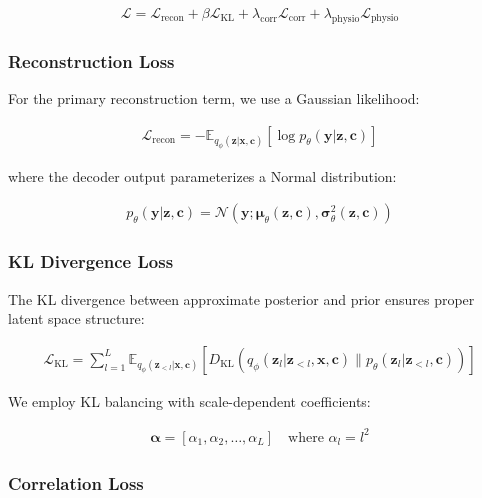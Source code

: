\documentclass[11pt]{article}
\begin{document}
\begin{align}
\mathcal{L} = \mathcal{L}_{\text{recon}} + \beta \mathcal{L}_{\text{KL}} + \lambda_{\text{corr}} \mathcal{L}_{\text{corr}} + \lambda_{\text{physio}} \mathcal{L}_{\text{physio}}
\end{align}

\subsubsection{Reconstruction Loss}

For the primary reconstruction term, we use a Gaussian likelihood:

\begin{align}
\mathcal{L}_{\text{recon}} = -\mathbb{E}_{q_\phi(\mathbf{z}|\mathbf{x},\mathbf{c})}[\log p_\theta(\mathbf{y}|\mathbf{z},\mathbf{c})]
\end{align}

where the decoder output parameterizes a Normal distribution:

\begin{align}
p_\theta(\mathbf{y}|\mathbf{z},\mathbf{c}) = \mathcal{N}(\mathbf{y}; \boldsymbol{\mu}_\theta(\mathbf{z},\mathbf{c}), \boldsymbol{\sigma}_\theta^2(\mathbf{z},\mathbf{c}))
\end{align}

\subsubsection{KL Divergence Loss}

The KL divergence between approximate posterior and prior ensures proper latent space structure:

\begin{align}
\mathcal{L}_{\text{KL}} = \sum_{l=1}^L \mathbb{E}_{q_\phi(\mathbf{z}_{<l}|\mathbf{x},\mathbf{c})}[D_{\text{KL}}(q_\phi(\mathbf{z}_l|\mathbf{z}_{<l},\mathbf{x},\mathbf{c}) \| p_\theta(\mathbf{z}_l|\mathbf{z}_{<l},\mathbf{c}))]
\end{align}

We employ KL balancing with scale-dependent coefficients:

\begin{align}
\boldsymbol{\alpha} = [\alpha_1, \alpha_2, \ldots, \alpha_L] \quad \text{where } \alpha_l = l^2
\end{align}

\subsubsection{Correlation Loss}
\end{document}
